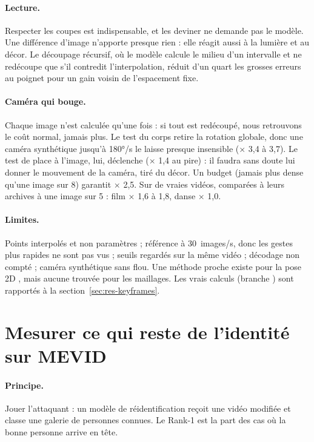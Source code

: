 \documentclass[11pt,a4paper]{report}
\newcommand{\code}[1]{\texttt{\detokenize{#1}}}
\begin{document}
\paragraph{Lecture.} Respecter les coupes est indispensable, et les deviner ne demande pas le modèle. Une différence d'image n'apporte
presque rien : elle réagit aussi à la lumière et au décor. Le découpage récursif, où le modèle calcule le milieu d'un intervalle et ne
redécoupe que s'il contredit l'interpolation, réduit d'un quart les grosses erreurs au poignet pour un gain voisin de l'espacement fixe.

\paragraph{Caméra qui bouge.} Chaque image n'est calculée qu'une fois : si tout est redécoupé, nous retrouvons le coût normal, jamais plus.
Le test du corps retire la rotation globale, donc une caméra synthétique jusqu'à 180°/s le laisse presque insensible ($\times$ 3,4 à
3,7). Le test de place à l'image, lui, déclenche ($\times$ 1,4 au pire) : il faudra sans doute lui donner le mouvement de la caméra,
tiré du décor. Un budget (jamais plus dense qu'une image sur 8) garantit $\times$ 2,5. Sur de vraies vidéos, comparées à leurs archives à
une image sur 5 : film $\times$ 1,6 à 1,8, danse $\times$ 1,0.

\paragraph{Limites.} Points interpolés et non paramètres ; référence à 30~images/s, donc les gestes plus rapides ne sont pas vus ; seuils
regardés sur la même vidéo ; décodage non compté ; caméra synthétique sans flou. Une méthode proche existe pour la pose 2D
\cite{zhang2020kfpn}, mais aucune trouvée pour les maillages. Les vrais calculs (branche \code{optim/mesh-keyframes}) sont rapportés à
la section~\ref{sec:res-keyframes}.

\section{Mesurer ce qui reste de l'identité sur MEVID}
\label{sec:privacy}

\paragraph{Principe.} Jouer l'attaquant : un modèle de réidentification reçoit une vidéo modifiée et classe une galerie de personnes
connues. Le Rank-1 est la part des cas où la bonne personne arrive en tête.
\end{document}
